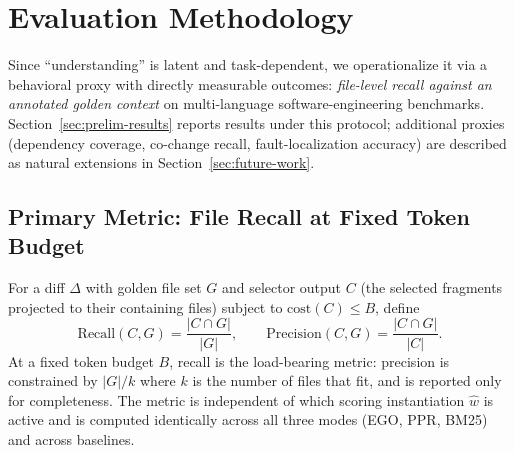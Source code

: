 \documentclass[11pt, a4paper]{article}
\begin{document}
\newpage
\section{Evaluation Methodology}
\label{sec:eval}

Since ``understanding'' is latent and task-dependent, we operationalize it via a behavioral proxy with directly measurable outcomes: \emph{file-level recall against an annotated golden context} on multi-language software-engineering benchmarks. Section~\ref{sec:prelim-results} reports results under this protocol; additional proxies (dependency coverage, co-change recall, fault-localization accuracy) are described as natural extensions in Section~\ref{sec:future-work}.

\subsection{Primary Metric: File Recall at Fixed Token Budget}

For a diff $\Delta$ with golden file set $G$ and selector output $C$ (the selected fragments projected to their containing files) subject to $\mathrm{cost}(C) \leq B$, define
\begin{equation}
\mathrm{Recall}(C, G) = \frac{|C \cap G|}{|G|}, \qquad \mathrm{Precision}(C, G) = \frac{|C \cap G|}{|C|}.
\end{equation}
At a fixed token budget $B$, recall is the load-bearing metric: precision is constrained by $|G|/k$ where $k$ is the number of files that fit, and is reported only for completeness. The metric is independent of which scoring instantiation $\hat{w}$ is active and is computed identically across all three modes (EGO, PPR, BM25) and across baselines.
\end{document}
